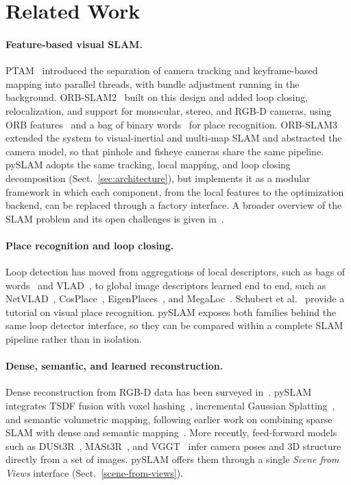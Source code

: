 \documentclass{article}
\let\oldparagraph\paragraph
\renewcommand{\paragraph}[1]{\oldparagraph{#1}\mbox{}}
\begin{document}
\hypertarget{related-work}{%
\section{Related Work}\label{related-work}}

\paragraph{Feature-based visual SLAM.}
PTAM~\cite{PTAM} introduced the separation of camera tracking and keyframe-based mapping into parallel threads, with bundle adjustment running in the background. ORB-SLAM2~\cite{ORB_SLAM2} built on this design and added loop closing, relocalization, and support for monocular, stereo, and RGB-D cameras, using ORB features~\cite{rublee2011orb} and a bag of binary words~\cite{galvez2012bags} for place recognition. ORB-SLAM3~\cite{campos2021orbslam3} extended the system to visual-inertial and multi-map SLAM and abstracted the camera model, so that pinhole and fisheye cameras share the same pipeline. pySLAM adopts the same tracking, local mapping, and loop closing decomposition (Sect.~\ref{sec:architecture}), but implements it as a modular framework in which each component, from the local features to the optimization backend, can be replaced through a factory interface. A broader overview of the SLAM problem and its open challenges is given in~\cite{cadena2017past}.

\paragraph{Place recognition and loop closing.}
Loop detection has moved from aggregations of local descriptors, such as bags of words~\cite{galvez2012bags} and VLAD~\cite{jegou2010aggregating}, to global image descriptors learned end to end, such as NetVLAD~\cite{arandjelovic2016netvlad}, CosPlace~\cite{berton2023cosplace}, EigenPlaces~\cite{berton2023eigenplaces}, and MegaLoc~\cite{berton2025megaloc}. Schubert et al.~\cite{schubert2023visual} provide a tutorial on visual place recognition. pySLAM exposes both families behind the same loop detector interface, so they can be compared within a complete SLAM pipeline rather than in isolation.

\paragraph{Dense, semantic, and learned reconstruction.}
Dense reconstruction from RGB-D data has been surveyed in~\cite{zollhofer2018state}. pySLAM integrates TSDF fusion with voxel hashing~\cite{dong2022ash}, incremental Gaussian Splatting~\cite{matsuki2023gaussian,kerbl20233d}, and semantic volumetric mapping, following earlier work on combining sparse SLAM with dense and semantic mapping~\cite{freda2023plvs,pyslamSemantic2025}. More recently, feed-forward models such as DUSt3R~\cite{wang2023dust3r}, MASt3R~\cite{leroy2024grounding}, and VGGT~\cite{wang2025vggt} infer camera poses and 3D structure directly from a set of images. pySLAM offers them through a single \textit{Scene from Views} interface (Sect.~\ref{scene-from-views}).
\end{document}

